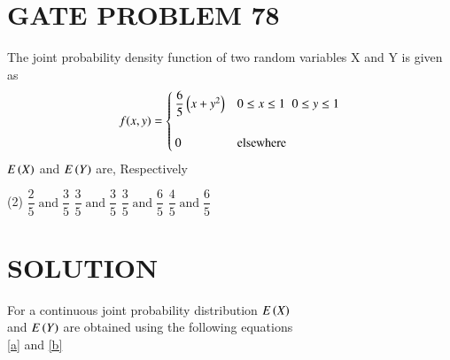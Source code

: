 \documentclass[journal,12pt,twocolumn]{IEEEtran}
\begin{document}
\section{GATE PROBLEM 78} 
The joint probability density function of two random variables X and Y is given as
\[
  f(x,y) =
  \begin{cases}
      \dfrac{6}{5}\left(x + y^{2}\right)  & 0\leq x \leq 1\;\;0\leq y \leq 1 \\ \\
                  0                 & \text{elsewhere} 
  \end{cases}
\] 
$E\left(X\right)$ and $E\left(Y\right)$ are, Respectively 
\vspace{0.5cm}
\begin{tasks}(2)
\task $\dfrac{2}{5}\;\text{and}\;\dfrac{3}{5}$
\task $\dfrac{3}{5}\;\text{and}\;\dfrac{3}{5}$
\task $\dfrac{3}{5}\;\text{and}\;\dfrac{6}{5}$
\task $\dfrac{4}{5}\;\text{and}\;\dfrac{6}{5}$
\end{tasks}

\bigskip

\section{SOLUTION}
For a continuous joint probability distribution  $E\left(X\right)$ \\
and $E\left(Y\right)$ are obtained using the following equations  \\
\eqref{a} and \eqref{b}
\end{document}
